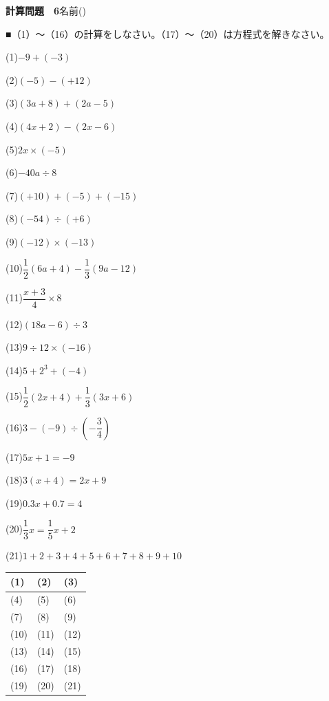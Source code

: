 \documentclass[a4paper,11pt]{ltjsarticle}
\newlength{\qcol}\setlength{\qcol}{0.47\textwidth}
\newlength{\qgap}
\newlength{\anscolw}\setlength{\anscolw}{0.30\textwidth}
\newlength{\ansh}
\newcommand{\Q}[2]{\parbox[t]{\qcol}{\raggedright (#1)\hspace{0.6em}$\displaystyle #2$}}
\newcommand{\QR}[4]{\Q{#1}{#2}\hfill\Q{#3}{#4}\par\vspace{\qgap}}
\newcommand{\anscell}[1]{\rule[-\ansdrop]{0pt}{\ansh}(#1)}
\newlength{\ansdrop}
\begin{document}
{\large\bfseries 計算問題　6}\hfill 名前(\underline{\hspace{32mm}})\par\vspace{3mm}
■（1）〜（16）の計算をしなさい。（17）〜（20）は方程式を解きなさい。\par\vspace{3mm}
\setlength{\qgap}{5.4mm}
\QR{1}{-9+(-3)}{2}{(-5)-(+12)}
\QR{3}{(3a+8)+(2a-5)}{4}{(4x+2)-(2x-6)}
\QR{5}{2x\times(-5)}{6}{-40a\div8}
\QR{7}{(+10)+(-5)+(-15)}{8}{(-54)\div(+6)}
\QR{9}{(-12)\times(-13)}{10}{\dfrac{1}{2}(6a+4)-\dfrac{1}{3}(9a-12)}
\QR{11}{\dfrac{x+3}{4}\times8}{12}{(18a-6)\div3}
\QR{13}{9\div12\times(-16)}{14}{5+2^3+(-4)}
\QR{15}{\dfrac{1}{2}(2x+4)+\dfrac{1}{3}(3x+6)}{16}{3-(-9)\div\left(-\dfrac{3}{4}\right)}
\QR{17}{5x+1=-9}{18}{3(x+4)=2x+9}
\QR{19}{0.3x+0.7=4}{20}{\dfrac{1}{3}x=\dfrac{1}{5}x+2}
\vspace{1mm}
\Q{21}{1+2+3+4+5+6+7+8+9+10}\par\vspace{3mm}
\setlength{\ansh}{9.5mm}\setlength{\ansdrop}{6mm}%
\begin{center}\begin{tabular}{|p{\anscolw}|p{\anscolw}|p{\anscolw}|}\hline
\anscell{1} & \anscell{2} & \anscell{3} \\\hline
\anscell{4} & \anscell{5} & \anscell{6} \\\hline
\anscell{7} & \anscell{8} & \anscell{9} \\\hline
\anscell{10} & \anscell{11} & \anscell{12} \\\hline
\anscell{13} & \anscell{14} & \anscell{15} \\\hline
\anscell{16} & \anscell{17} & \anscell{18} \\\hline
\anscell{19} & \anscell{20} & \anscell{21} \\\hline
\end{tabular}\end{center}
\end{document}
